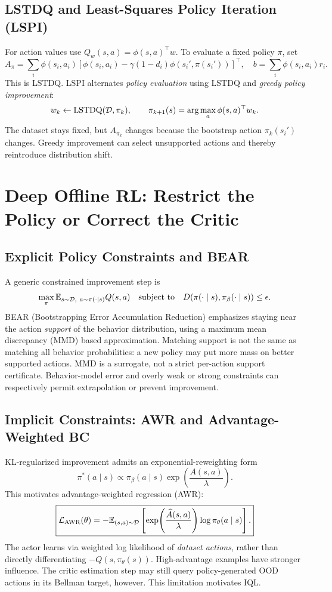 \subsection{LSTDQ and Least-Squares Policy Iteration (LSPI)}
For action values use $Q_w(s,a)=\phi(s,a)^\top w$. To evaluate a fixed policy $\pi$, set
\[
A_\pi=\sum_i\phi(s_i,a_i)
\left[\phi(s_i,a_i)-\gamma(1-d_i)\phi(s_i',\pi(s_i'))\right]^\top,\quad
b=\sum_i\phi(s_i,a_i)r_i.
\]
This is LSTDQ. LSPI alternates \emph{policy evaluation} using LSTDQ and \emph{greedy policy improvement}:
\[
w_k\leftarrow \operatorname{LSTDQ}(\mathcal{D},\pi_k),\qquad
\pi_{k+1}(s)=\arg\max_a\phi(s,a)^\top w_k.
\]
The dataset stays fixed, but $A_{\pi_k}$ changes because the bootstrap action $\pi_k(s_i')$ changes. Greedy improvement can select unsupported actions and thereby reintroduce distribution shift.

\section{Deep Offline RL: Restrict the Policy or Correct the Critic}
\subsection{Explicit Policy Constraints and BEAR}
A generic constrained improvement step is
\[
\max_\pi \mathbb{E}_{s\sim\mathcal{D},\ a\sim\pi(\cdot\mid s)}Q(s,a)
\quad\text{subject to}\quad
D(\pi(\cdot\mid s),\pi_\beta(\cdot\mid s))\leq\epsilon.
\]
BEAR (Bootstrapping Error Accumulation Reduction) emphasizes staying near the action \emph{support} of the behavior distribution, using a maximum mean discrepancy (MMD) based approximation. Matching support is not the same as matching all behavior probabilities: a new policy may put more mass on better supported actions. MMD is a surrogate, not a strict per-action support certificate. Behavior-model error and overly weak or strong constraints can respectively permit extrapolation or prevent improvement.

\subsection{Implicit Constraints: AWR and Advantage-Weighted BC}
KL-regularized improvement admits an exponential-reweighting form
\[
\pi^*(a\mid s)\propto\pi_\beta(a\mid s)
\exp\!\left(\frac{A(s,a)}{\lambda}\right).
\]
This motivates advantage-weighted regression (AWR):
\[
\boxed{\mathcal L_{\rm AWR}(\theta)=
-\mathbb{E}_{(s,a)\sim\mathcal{D}}
\left[\exp\!\left(\frac{\widehat A(s,a)}{\lambda}\right)
\log\pi_\theta(a\mid s)\right].}
\]
The actor learns via weighted log likelihood of \emph{dataset actions}, rather than directly differentiating $-Q(s,\pi_\theta(s))$. High-advantage examples have stronger influence. The critic estimation step may still query policy-generated OOD actions in its Bellman target, however. This limitation motivates IQL.

